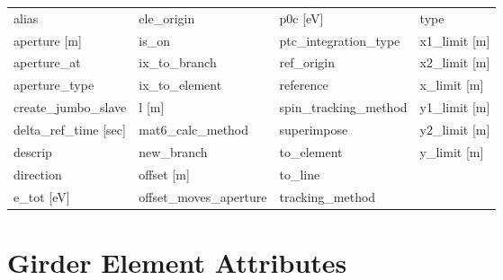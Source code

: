  \begin{tabular}{llll} \toprule
alias                          & ele_origin                     & p0c [eV]                       & type                           \\
aperture [m]                   & is_on                          & ptc_integration_type           & x1_limit [m]                   \\
aperture_at                    & ix_to_branch                   & ref_origin                     & x2_limit [m]                   \\
aperture_type                  & ix_to_element                  & reference                      & x_limit [m]                    \\
create_jumbo_slave             & l [m]                          & spin_tracking_method           & y1_limit [m]                   \\
delta_ref_time [sec]           & mat6_calc_method               & superimpose                    & y2_limit [m]                   \\
descrip                        & new_branch                     & to_element                     & y_limit [m]                    \\
direction                      & offset [m]                     & to_line                        &                                \\
e_tot [eV]                     & offset_moves_aperture          & tracking_method                &                                \\
 \bottomrule
 \end{tabular}
 \vfill

 \section{Girder Element Attributes}
 \label{s:list.girder}

